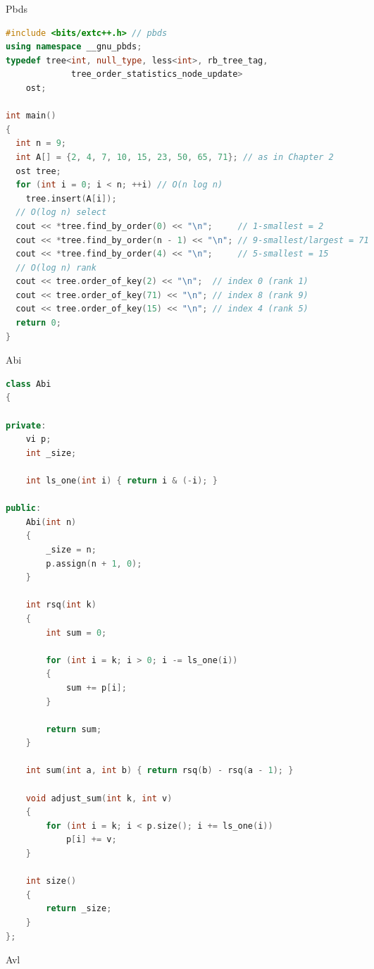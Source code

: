 \documentclass[leter]{amsart}
\begin{document}
Pbds
\begin{multicols}{2}
\begin{lstlisting}[language=C++]
#include <bits/extc++.h> // pbds
using namespace __gnu_pbds;
typedef tree<int, null_type, less<int>, rb_tree_tag,
             tree_order_statistics_node_update>
    ost;

int main()
{
  int n = 9;
  int A[] = {2, 4, 7, 10, 15, 23, 50, 65, 71}; // as in Chapter 2
  ost tree;
  for (int i = 0; i < n; ++i) // O(n log n)
    tree.insert(A[i]);
  // O(log n) select
  cout << *tree.find_by_order(0) << "\n";     // 1-smallest = 2
  cout << *tree.find_by_order(n - 1) << "\n"; // 9-smallest/largest = 71
  cout << *tree.find_by_order(4) << "\n";     // 5-smallest = 15
  // O(log n) rank
  cout << tree.order_of_key(2) << "\n";  // index 0 (rank 1)
  cout << tree.order_of_key(71) << "\n"; // index 8 (rank 9)
  cout << tree.order_of_key(15) << "\n"; // index 4 (rank 5)
  return 0;
}


\end{lstlisting}
\end{multicols}
Abi
\begin{multicols}{2}
\begin{lstlisting}[language=C++]
class Abi
{

private:
    vi p;
    int _size;

    int ls_one(int i) { return i & (-i); }

public:
    Abi(int n)
    {
        _size = n;
        p.assign(n + 1, 0);
    }

    int rsq(int k)
    {
        int sum = 0;

        for (int i = k; i > 0; i -= ls_one(i))
        {
            sum += p[i];
        }

        return sum;
    }

    int sum(int a, int b) { return rsq(b) - rsq(a - 1); }

    void adjust_sum(int k, int v)
    {
        for (int i = k; i < p.size(); i += ls_one(i))
            p[i] += v;
    }

    int size()
    {
        return _size;
    }
};

\end{lstlisting}
\end{multicols}
Avl
\end{document}
